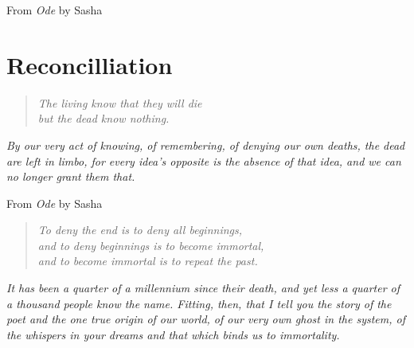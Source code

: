 \documentclass[10pt]{memoir}
\begin{document}
  From \emph{Ode} by Sasha
  \vfill
  
  
  
  
  
  
  
  
  
  
  
  

  \renewcommand*{\theHpart}{reconcilliation}
  \part{Reconcilliation}
  \begin{quote}\itshape
    The living know that they will die \\
    but the dead know nothing.
  \end{quote}

  \noindent\emph{By our very act of knowing, of remembering, of denying our own deaths, the dead are left in limbo, for every idea's opposite is the absence of that idea, and we can no longer grant them that.}

  \vspace{1em}

  From \emph{Ode} by Sasha
  \vfill

  
  
  
  
  
  
  
  
  

  \cleardoublepage
  \thispagestyle{empty}
  \null
  \vfill
  \begin{quote}\itshape
    To deny the end is to deny all beginnings, \\
    and to deny beginnings is to become immortal, \\
    and to become immortal is to repeat the past.
  \end{quote}

  \noindent\emph{It has been a quarter of a millennium since their death, and yet less a quarter of a thousand people know the name. Fitting, then, that I tell you the story of the poet and the one true origin of our world, of our very own ghost in the system, of the whispers in your dreams and that which binds us to immortality.}

  \vspace{1em}
\end{document}
